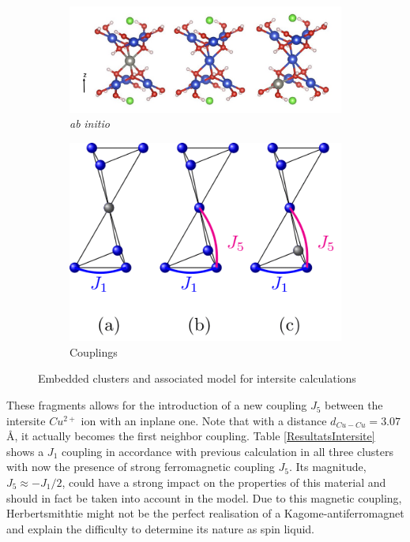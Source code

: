 \documentclass[10pt]{report}
\numberwithin{equation}{section}
\begin{document}
\begin{figure}[!h]
    \centering
    \begin{subfigure}{.5\textwidth}
      \centering
      \includegraphics[width=\linewidth]{Images/FragmentDefauts.png}
      \caption{\textit{ab} \textit{initio}}
      \label{fig:FragmentIntersite}
    \end{subfigure}%
    \begin{subfigure}{.5\textwidth}
      \centering
      \includegraphics[width=\linewidth]{Images/ModeleDFT_interplan.png}
      \caption{Couplings}
      \label{fig:CouplingsInterplan}
    \end{subfigure}
    \caption{Embedded clusters and associated model for intersite calculations}
    \label{fig:FragmentInterplan}
    \end{figure}

These fragments allows for the introduction of a new coupling $J_5$ between the intersite $Cu^{2+}$ ion with an inplane one.
Note that with a distance $d_{Cu-Cu}=3.07$\AA, it actually becomes the first neighbor coupling.
Table \ref{ResultatsIntersite} shows a $J_1$ coupling in accordance with previous calculation in all three clusters with now the presence of strong ferromagnetic coupling $J_5$.
Its magnitude, $J_5\approx - J_1/2$, could have a strong impact on the properties of this material and should in fact be taken into account in the model.
Due to this magnetic coupling, Herbertsmithtie might not be the perfect realisation of a Kagome-antiferromagnet and explain the difficulty to determine its nature as spin liquid.
\end{document}
